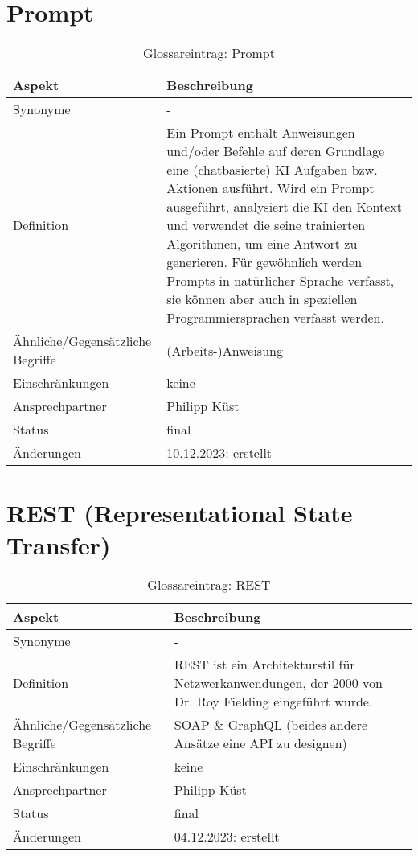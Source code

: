 \section{Prompt}\label{sec:glossar_prompt}
\begin{table}[H]
    \label{tab:glossar_prompt}
    \begin{tabularx}{\textwidth}{|l|X|}
        \hline
        \textbf{Aspekt}                  & \textbf{Beschreibung} \\
        \hline
        Synonyme                         & -                     \\
        \hline
        Definition & Ein Prompt enthält Anweisungen und/oder Befehle auf deren Grundlage eine (chatbasierte) KI Aufgaben bzw. Aktionen ausführt.
        Wird ein Prompt ausgeführt, analysiert die KI den Kontext und verwendet die seine trainierten Algorithmen, um eine Antwort zu generieren.
        Für gewöhnlich werden Prompts in natürlicher Sprache verfasst, sie können aber auch in speziellen Programmiersprachen verfasst werden. \\
        \hline
        Ähnliche/Gegensätzliche Begriffe & (Arbeits-)Anweisung   \\
        \hline
        Einschränkungen                  & keine                 \\
        \hline
        Ansprechpartner                  & Philipp Küst          \\
        \hline
        Status                           & final                 \\
        \hline
        Änderungen                       & 10.12.2023: erstellt  \\
        \hline
    \end{tabularx}
    \caption{Glossareintrag: Prompt}
\end{table}


\section{REST (Representational State Transfer)}\label{sec:glossar_rest}
\begin{table}[H]
    \label{tab:glossar_rest}
    \begin{tabularx}{\textwidth}{|l|X|}
        \hline
        \textbf{Aspekt} & \textbf{Beschreibung} \\
        \hline
        Synonyme & - \\
        \hline
        Definition & REST ist ein Architekturstil für Netzwerkanwendungen, der 2000 von Dr. Roy Fielding eingeführt wurde. \\
        \hline
        Ähnliche/Gegensätzliche Begriffe & SOAP \& GraphQL (beides andere Ansätze eine API zu designen) \\
        \hline
        Einschränkungen & keine \\
        \hline
        Ansprechpartner & Philipp Küst \\
        \hline
        Status & final \\
        \hline
        Änderungen & 04.12.2023: erstellt \\
        \hline
    \end{tabularx}
    \caption{Glossareintrag: REST}
\end{table}